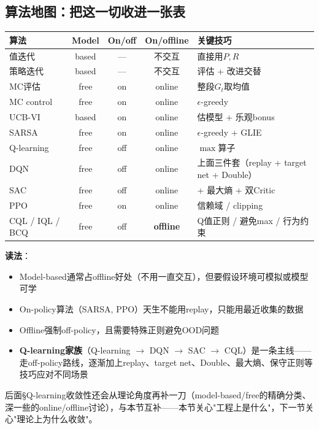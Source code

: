 \documentclass[11pt,a4paper]{article}
\theoremstyle{definition}
\begin{document}
\subsection{算法地图：把这一切收进一张表}

\begin{keypoint}[三维分类总览]
\begin{center}
\small
\begin{tabular}{l|c|c|c|l}
\toprule
算法 & Model & On/off & On/offline & 关键技巧 \\
\midrule
值迭代 & based & — & 不交互 & 直接用$P, R$ \\
策略迭代 & based & — & 不交互 & 评估 + 改进交替 \\
MC评估 & free & on & online & 整段$G_t$取均值 \\
MC control & free & on & online & $\epsilon$-greedy \\
UCB-VI & based & on & online & 估模型 + 乐观bonus \\
SARSA & free & on & online & $\epsilon$-greedy + GLIE \\
Q-learning & free & off & online & $\max$算子 \\
\midrule
DQN & free & off & online & 上面三件套（replay + target net + Double） \\
SAC & free & off & online & + 最大熵 + 双Critic \\
PPO & free & on & online & 信赖域 / clipping \\
CQL / IQL / BCQ & free & off & \textbf{offline} & Q值正则 / 避免max / 行为约束 \\
\bottomrule
\end{tabular}
\end{center}

\textbf{读法}：
\begin{itemize}
\item Model-based通常占offline好处（不用一直交互），但要假设环境可模拟或模型可学
\item On-policy算法（SARSA, PPO）天生不能用replay，只能用最近收集的数据
\item Offline强制off-policy，且需要特殊正则避免OOD问题
\item \textbf{Q-learning家族}（Q-learning $\to$ DQN $\to$ SAC $\to$ CQL）是一条主线——走off-policy路线，逐渐加上replay、target net、Double、最大熵、保守正则等技巧应对不同场景
\end{itemize}

后面§Q-learning收敛性还会从理论角度再补一刀（model-based/free的精确分类、深一些的online/offline讨论），与本节互补——本节关心"工程上是什么"，下一节关心"理论上为什么收敛"。
\end{keypoint}
\end{document}
